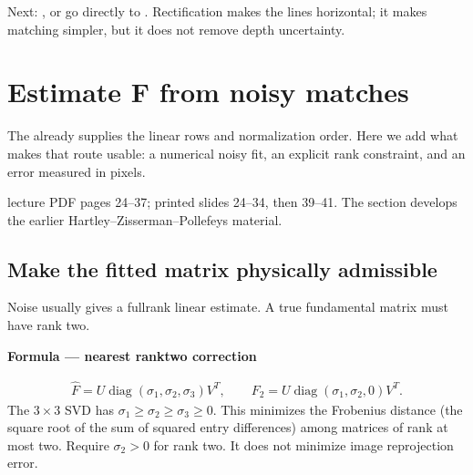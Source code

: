 \documentclass[letterpaper,11pt,english,openany,oneside]{jupyterBook}
\begin{document}
\sphinxAtStartPar
Next: {\hyperref[\detokenize{lectures/lecture04/estimation::doc}]{}}, or go directly to {\hyperref[\detokenize{lectures/lecture04/stereo::doc}]{}}. Rectification makes the lines horizontal; it makes matching simpler, but it does not remove depth uncertainty.

\sphinxstepscope


\section{Estimate F from noisy matches}
\label{\detokenize{lectures/lecture04/estimation:estimate-f-from-noisy-matches}}\label{\detokenize{lectures/lecture04/estimation:lec04-estimation}}\label{\detokenize{lectures/lecture04/estimation::doc}}
\sphinxAtStartPar
The {\hyperref[\detokenize{lectures/lecture02/two-view::doc}]{}} already supplies the linear rows and normalization order. Here we add what makes that route usable: a numerical noisy fit, an explicit rank constraint, and an error measured in pixels.

\sphinxAtStartPar
{} lecture PDF pages 24–37; printed slides 24–34, then 39–41. The section develops the earlier Hartley–Zisserman–Pollefeys material.


\subsection{Make the fitted matrix physically admissible}
\label{\detokenize{lectures/lecture04/estimation:make-the-fitted-matrix-physically-admissible}}
\sphinxAtStartPar
Noise usually gives a full\sphinxhyphen{}rank linear estimate. A true fundamental matrix must have rank two.

\begin{TextbookBox}
\textbf{Formula — nearest rank\sphinxhyphen{}two correction}\par\smallskip
\begin{equation}\label{equation:lectures/lecture04/estimation:eq-lec04-ranktwo}
\begin{split}\widehat F=U\operatorname{diag}(\sigma_1,\sigma_2,\sigma_3)V^T,
\qquad
F_2=U\operatorname{diag}(\sigma_1,\sigma_2,0)V^T.\end{split}
\end{equation}
\sphinxAtStartPar
The \(3\times3\) SVD has \(\sigma_1\ge\sigma_2\ge\sigma_3\ge0\). This minimizes the Frobenius distance (the square root of the sum of squared entry differences) among matrices of rank at most two. Require \(\sigma_2>0\) for rank  two. It does not minimize image reprojection error.

\end{TextbookBox}
\end{document}
